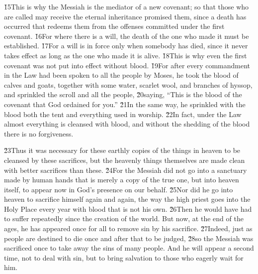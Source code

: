 \v{15}This is why the Messiah is the mediator of a new covenant; so that those who are called may receive the eternal inheritance promised them, since a death has occurred that redeems them from the offenses committed under the first covenant. \v{16}For where there is a will, the death of the one who made it must be established. \v{17}For a will is in force only when somebody has died, since it never takes effect as long as the one who made it is alive. \v{18}This is why even the first covenant was not put into effect without blood. \v{19}For after every commandment in the Law had been spoken to all the people by Moses, he took the blood of calves and goats, together with some water, scarlet wool, and branches of hyssop, and sprinkled the scroll and all the people, \v{20}saying, ``This is the blood of the covenant that God ordained for you.'' \v{21}In the same way, he sprinkled with the blood both the tent and everything used in worship. \v{22}In fact, under the Law almost everything is cleansed with blood, and without the shedding of the blood there is no forgiveness.

\v{23}Thus it was necessary for these earthly copies of the things in heaven to be cleansed by these sacrifices, but the heavenly things themselves are made clean with better sacrifices than these. \v{24}For the Messiah did not go into a sanctuary made by human hands that is merely a copy of the true one, but into heaven itself, to appear now in God's presence on our behalf. \v{25}Nor did he go into heaven to sacrifice himself again and again, the way the high priest goes into the Holy Place every year with blood that is not his own. \v{26}Then he would have had to suffer repeatedly since the creation of the world. But now, at the end of the ages, he has appeared once for all to remove sin by his sacrifice. \v{27}Indeed, just as people are destined to die once and after that to be judged, \v{28}so the Messiah was sacrificed once to take away the sins of many people. And he will appear a second time, not to deal with sin, but to bring salvation to those who eagerly wait for him.

